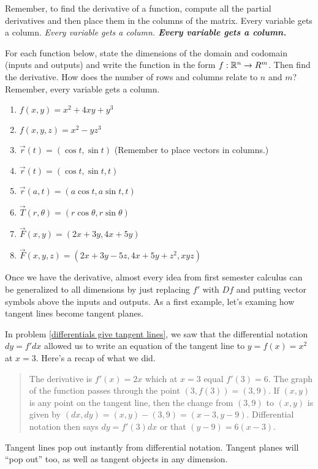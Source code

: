 Remember, to find the derivative of a function, compute all the partial derivatives and then place them in the columns of the matrix. Every variable gets a column. {\it Every variable gets a column. {\bf Every variable gets a column.}} 

\begin{problem}
 For each function below, state the dimensions of the domain and codomain (inputs and outputs) and write the function in the form $f:\mathbb{R}^n\to R^m$. Then find the derivative. How does the number of rows and columns relate to $n$ and $m$? Remember, every variable gets a column. 
\begin{enumerate}
 \item $f(x,y)=x^2+4xy+y^3$
 \item $f(x,y,z)=x^2-yz^3$
 \item $\vec r(t)=(\cos t, \sin t)$ (Remember to place vectors in columns.)
 \item $\vec r(t)=(\cos t, \sin t,t)$
 \item $\vec r(a,t)=(a\cos t, a\sin t,t)$
 \item $\vec T(r,\theta)=(r\cos \theta, r\sin \theta)$
 \item $\vec F(x,y)=(2x+3y,4x+5y)$
 \item $\vec F(x,y,z)=(2x+3y-5z,4x+5y+z^2, xyz)$
\end{enumerate}
\end{problem}

Once we have the derivative, almost every idea from first semester calculus can be generalized to all dimensions by just replacing $f'$ with $Df$ and putting vector symbols above the inputs and outputs. As a first example, let's examing how tangent lines become tangent planes.

\begin{remark}
  In problem \ref{differentials give tangent lines}, we saw that the differential notation $dy=f'dx$ allowed us to write an equation of the tangent line to $y=f(x)=x^2$ at $x=3$. Here's a recap of what we did.
\begin{quote} The derivative is $f'(x)=2x$ which at $x=3$ equal $f'(3)= 6$. The graph of the function passes through the point $(3,f(3)) = (3,9)$. If $(x,y)$ is any point on the tangent line, then the change from $(3,9)$ to $(x,y)$ is given by $(dx,dy)=(x,y)-(3,9)=(x-3,y-9)$.  Differential notation then says $dy=f'(3)dx$ or that $(y-9)=6(x-3)$.  
\end{quote}
Tangent lines pop out instantly from differential notation. Tangent planes will ``pop out'' too, as well as tangent objects in any dimension. 
\end{remark}


